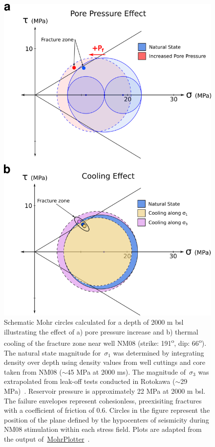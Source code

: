 \begin{figure}[p]
\begin{center}
\includegraphics[width=0.79\columnwidth]{Chapter_3_Nga/figures/Nga_2000mbsl_NM08_fz_schematic/Nga_2000mbsl_NM08_fz_schematic}
\caption[Schematic Mohr's circles for NM08 stimulation]{{
Schematic Mohr circles calculated for a depth of 2000 m bsl illustrating
the effect of a) pore pressure increase and b) thermal cooling of the
fracture zone near well NM08 (strike: 191\textsuperscript{o}, dip:
66\textsuperscript{o}). The natural state magnitude
for~\(\sigma_{1}\) was determined by integrating density over depth
using density values from well cuttings and core taken from NM08
($\sim$45 MPa at 2000 ms). The magnitude
of~\(\sigma_{3}\) was extrapolated from leak-off tests conducted in
Rotokawa ($\sim$29 MPa)~\protect\citep{davidson_2012}. Reservoir
pressure is approximately 22 MPa at 2000 m bsl. The failure envelopes
represent cohesionless, preexisiting fractures with a coefficient of
friction of 0.6. Circles in the figure represent the position of the
plane defined by the hypocenters of seismicity during NM08 stimulation
within each stress field. Plots are adapted from the output
of~\href{http://www.geo.cornell.edu/geology/faculty/RWA/programs/mohrplotter.html}{MohrPlotter}~\protect\citep{Allmendinger}.
{\label{111394}}%
}}
\end{center}
\end{figure}

